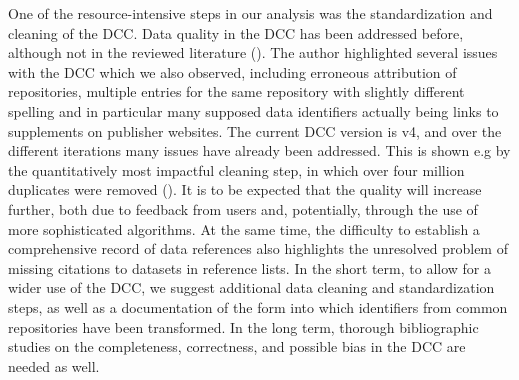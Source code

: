 \documentclass[
  letterpaper,
  DIV=11,
  numbers=noendperiod]{scrartcl}
\begin{document}
One of the resource-intensive steps in our analysis was the
standardization and cleaning of the DCC. Data quality in the DCC has
been addressed before, although not in the reviewed literature
(). The author highlighted several
issues with the DCC which we also observed, including erroneous
attribution of repositories, multiple entries for the same repository
with slightly different spelling and in particular many supposed data
identifiers actually being links to supplements on publisher websites.
The current DCC version is v4, and over the different iterations many
issues have already been addressed. This is shown e.g by the
quantitatively most impactful cleaning step, in which over four million
duplicates were removed
(). It is to
be expected that the quality will increase further, both due to feedback
from users and, potentially, through the use of more sophisticated
algorithms. At the same time, the difficulty to establish a
comprehensive record of data references also highlights the unresolved
problem of missing citations to datasets in reference lists. In the
short term, to allow for a wider use of the DCC, we suggest additional
data cleaning and standardization steps, as well as a documentation of
the form into which identifiers from common repositories have been
transformed. In the long term, thorough bibliographic studies on the
completeness, correctness, and possible bias in the DCC are needed as
well.
\end{document}
